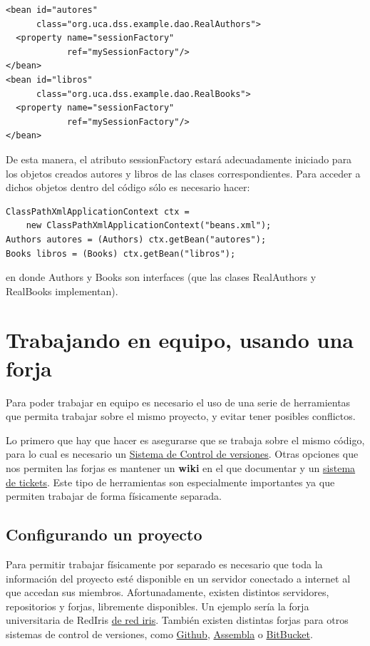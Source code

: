 \documentclass[11pt]{article}
\begin{document}
\begin{lstlisting}
<bean id="autores"
      class="org.uca.dss.example.dao.RealAuthors">
  <property name="sessionFactory"
            ref="mySessionFactory"/>
</bean>
<bean id="libros"
      class="org.uca.dss.example.dao.RealBooks">
  <property name="sessionFactory"
            ref="mySessionFactory"/>
</bean> \end{lstlisting}

De esta manera, el atributo \textsf{sessionFactory} estará adecuadamente
iniciado para los objetos creados autores y libros de las clases
correspondientes. Para acceder a dichos objetos dentro del código sólo es
necesario hacer:

\lstset{language=java}

\begin{lstlisting}
ClassPathXmlApplicationContext ctx =
    new ClassPathXmlApplicationContext("beans.xml");
Authors autores = (Authors) ctx.getBean("autores");
Books libros = (Books) ctx.getBean("libros");
\end{lstlisting}

en donde \textsf{Authors} y \textsf{Books} son interfaces (que las clases \textsf{RealAuthors} y \textsf{RealBooks} implementan).


\section{Trabajando en equipo, usando una forja} \label{sec-7}

Para poder trabajar en equipo es necesario el uso de una serie de herramientas
que permita trabajar sobre el mismo proyecto, y evitar tener posibles
conflictos.

Lo primero que hay que hacer es asegurarse que se trabaja sobre el mismo código,
para lo cual es necesario un \hyperref[sec-7-2]{Sistema de Control de
versiones}. Otras opciones que nos permiten las forjas es mantener un \textbf{wiki} en el
que documentar y un \hyperref[sec-7-4]{sistema de tickets}. Este tipo de
herramientas son especialmente importantes ya que permiten trabajar de forma
físicamente separada.


\subsection{Configurando un proyecto} \label{sec-7-1}

Para permitir trabajar físicamente por separado es necesario que toda la información
del proyecto esté disponible en un servidor conectado a internet al que 
accedan sus miembros. Afortunadamente, existen distintos servidores, repositorios y forjas,
libremente disponibles. Un ejemplo sería la forja universitaria de RedIris \href{http://forja.rediris.es}{de red iris}. También existen distintas forjas para otros sistemas de control de versiones, como
\href{http://github.com}{Github}, \href{http://www.assembla/}{Assembla} o \href{http://bitbucket.org}{BitBucket}.
\end{document}
